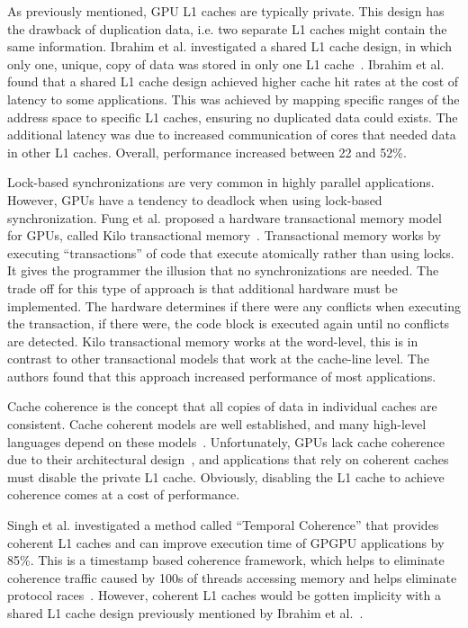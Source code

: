 As previously mentioned, GPU L1 caches are typically private.
This design has the drawback of duplication data, i.e. two separate L1 caches might contain the same information.
Ibrahim et al. investigated a shared L1 cache design, in which only one, unique, copy of data was stored in only one L1 cache~\cite{Ibrahim2020}.
Ibrahim et al. found that a shared L1 cache design achieved higher cache hit rates at the cost of latency to some applications.
This was achieved by mapping specific ranges of the address space to specific L1 caches, ensuring no duplicated data could exists.
The additional latency was due to increased communication of cores that needed data in other L1 caches.
Overall, performance increased between 22 and 52\%.

Lock-based synchronizations are very common in highly parallel applications.
However, GPUs have a tendency to deadlock when using lock-based synchronization.
Fung et al. proposed a hardware transactional memory model for GPUs, called Kilo transactional memory~\cite{Fung2011ISM}.
Transactional memory works by executing ``transactions'' of code that execute atomically rather than using locks.
It gives the programmer the illusion that no synchronizations are needed.
The trade off for this type of approach is that additional hardware must be implemented.
The hardware determines if there were any conflicts when executing the transaction, if there were, the code block is executed again until no conflicts are detected.
Kilo transactional memory works at the word-level, this is in contrast to other transactional models that work at the cache-line level.
The authors found that this approach increased performance of most applications.

Cache coherence is the concept that all copies of data in individual caches are consistent.
Cache coherent models are well established, and many high-level languages depend on these models~\cite{Singh2013}.
Unfortunately, GPUs lack cache coherence due to their architectural design~\cite{Singh2013}, and applications that rely on coherent caches must disable the private L1 cache.
Obviously, disabling the L1 cache to achieve coherence comes at a cost of performance.

Singh et al. investigated a method called ``Temporal Coherence'' that provides coherent L1 caches and can improve execution time of GPGPU applications by 85\%. This is a timestamp based coherence framework, which helps to eliminate coherence traffic caused by 100s of threads accessing memory and helps eliminate protocol races~\cite{Singh2013}.
However, coherent L1 caches would be gotten implicity with a shared L1 cache design previously mentioned by Ibrahim et al.~\cite{Ibrahim2020}.

